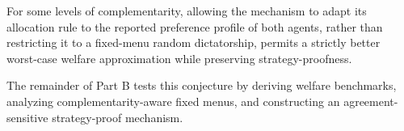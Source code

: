 

\begin{conjecture}
\label{conj:agreement} For some levels of complementarity, allowing the mechanism to adapt its allocation rule to the reported preference profile of both agents, rather than restricting it to a fixed-menu random dictatorship, permits a strictly better worst-case welfare approximation while preserving strategy-proofness.
\end{conjecture}
The remainder of Part B tests this conjecture by deriving welfare benchmarks,
analyzing complementarity-aware fixed menus, and constructing an agreement-sensitive
strategy-proof mechanism. 

\newpage